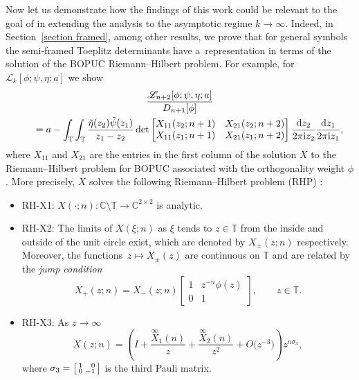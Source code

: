 \documentclass[10pt,a4paper]{amsart}
\numberwithin{equation}{section}
\newcommand{\C}{{\mathbb C}}
\newcommand{\T}{{\mathbb T}}
\newcommand{\di}{\displaystyle}
\newcommand{\ii}{{\rm i}}
\newcommand{\dd}{{\rm d}}
\begin{document}
	Now let us demonstrate how the findings of this work could be relevant to the goal of \cite{BGIKMMV} in extending the analysis to the asymptotic regime $k \to \infty$. Indeed, in Section~\ref{section framed}, among other results, we prove that for general symbols the semi-framed Toeplitz determinants have a~representation in terms of the solution of the BOPUC Riemann--Hilbert problem. For example, for~${\mathscr{L}_k[\phi;\psi,\eta;a]}$ we show
\begin{gather}
		\frac{\mathscr{L}_{n+2}[\phi;\psi, \eta ;a]}{D_{n+1}[\phi]} \nonumber\\
\qquad = a - \int_{\T} \int_{\T} \frac{ \Tilde{\eta}(z_2) \tilde{\psi}(z_1)}{z_1-z_2} \det \begin{bmatrix}
			X_{11}(z_2;n+1) & X_{21}(z_2;n+2) \\
			X_{11}(z_1;n+1) & X_{21}(z_1;n+2)
		\end{bmatrix} \frac{\dd z_2}{2 \pi \ii z_2} \frac{\dd z_1}{2 \pi \ii z_1},\label{L X intro}
	\end{gather}
	where $X_{11}$ and $X_{21}$ are the entries in the first column of the solution $X$ to the Riemann--Hilbert problem for BOPUC associated with the orthogonality weight $\phi$. More precisely, $X$ solves the following Riemann--Hilbert problem (RHP) \cite{BDJ}:
	\begin{itemize}\itemsep=0pt
		\item RH-X1: %
$X(\cdot;n)\colon \C\setminus \T \to \C^{2\times2}$ is analytic.
		\item RH-X2: %
The limits of $X(\xi;n)$ as $\xi$ tends to $z \in \T $ from the inside and outside of the unit circle exist, which are denoted by $X_{\pm}(z;n)$ respectively. Moreover, the functions~${z \mapsto X_{\pm}(z)}$ are continuous on $\T$ and are related by the \textit{jump condition}
		\begin{equation*}
			X_+(z;n)=X_-(z;n)\begin{bmatrix}
				1 & z^{-n}\phi(z) \\
				0 & 1
			\end{bmatrix}, \qquad z \in \T.
		\end{equation*}
		\item RH-X3: %
 As $z \to \infty$
		\begin{equation}\label{X asymp1}
			X(z;n)=\left(\di I+\frac{ \overset{\infty}{X}_1(n)}{z}+\frac{\overset{\infty}{X}_2(n)}{z^2} + O\big(z^{-3}\big)\right) z^{n \sigma_3},
		\end{equation}
		where $\sigma_3 = \left[\begin{smallmatrix} 1 & \hphantom{-}0 \\ 0 & -1 \end{smallmatrix}\right]$ is the third Pauli matrix.
	\end{itemize}
\end{document}
